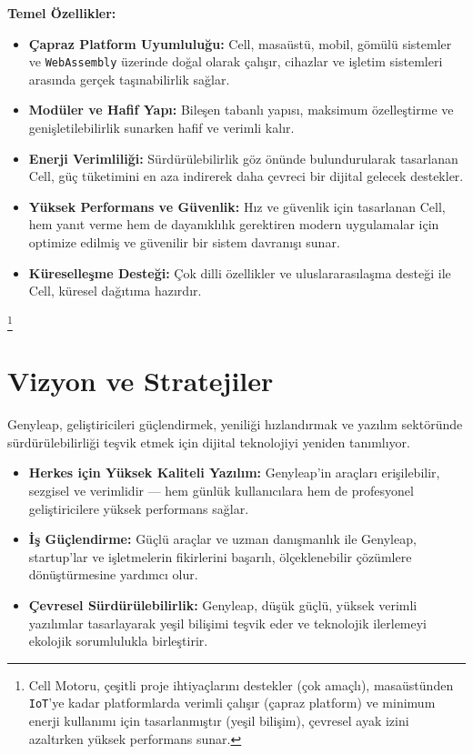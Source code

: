 \documentclass[a4paper,12pt,openany]{book}
\begin{document}
\textbf{Temel Özellikler:}
\begin{itemize}
    \item \textbf{Çapraz Platform Uyumluluğu:} Cell, masaüstü, mobil, gömülü sistemler ve \texttt{WebAssembly} üzerinde doğal olarak çalışır, cihazlar ve işletim sistemleri arasında gerçek taşınabilirlik sağlar.
    \item \textbf{Modüler ve Hafif Yapı:} Bileşen tabanlı yapısı, maksimum özelleştirme ve genişletilebilirlik sunarken hafif ve verimli kalır.
    \item \textbf{Enerji Verimliliği:} Sürdürülebilirlik göz önünde bulundurularak tasarlanan Cell, güç tüketimini en aza indirerek daha çevreci bir dijital gelecek destekler.
    \item \textbf{Yüksek Performans ve Güvenlik:} Hız ve güvenlik için tasarlanan Cell, hem yanıt verme hem de dayanıklılık gerektiren modern uygulamalar için optimize edilmiş ve güvenilir bir sistem davranışı sunar.
    \item \textbf{Küreselleşme Desteği:} Çok dilli özellikler ve uluslararasılaşma desteği ile Cell, küresel dağıtıma hazırdır.
\end{itemize}

\footnote{Cell Motoru, çeşitli proje ihtiyaçlarını destekler (çok amaçlı), masaüstünden \texttt{IoT}'ye kadar platformlarda verimli çalışır (çapraz platform) ve minimum enerji kullanımı için tasarlanmıştır (yeşil bilişim), çevresel ayak izini azaltırken yüksek performans sunar.}

\chapter{Vizyon ve Stratejiler}

Genyleap, geliştiricileri güçlendirmek, yeniliği hızlandırmak ve yazılım sektöründe sürdürülebilirliği teşvik etmek için dijital teknolojiyi yeniden tanımlıyor.

\begin{itemize}
    \item \textbf{Herkes için Yüksek Kaliteli Yazılım:} Genyleap’in araçları erişilebilir, sezgisel ve verimlidir — hem günlük kullanıcılara hem de profesyonel geliştiricilere yüksek performans sağlar.
    \item \textbf{İş Güçlendirme:} Güçlü araçlar ve uzman danışmanlık ile Genyleap, startup’lar ve işletmelerin fikirlerini başarılı, ölçeklenebilir çözümlere dönüştürmesine yardımcı olur.
    \item \textbf{Çevresel Sürdürülebilirlik:} Genyleap, düşük güçlü, yüksek verimli yazılımlar tasarlayarak yeşil bilişimi teşvik eder ve teknolojik ilerlemeyi ekolojik sorumlulukla birleştirir.
\end{itemize}
\end{document}
